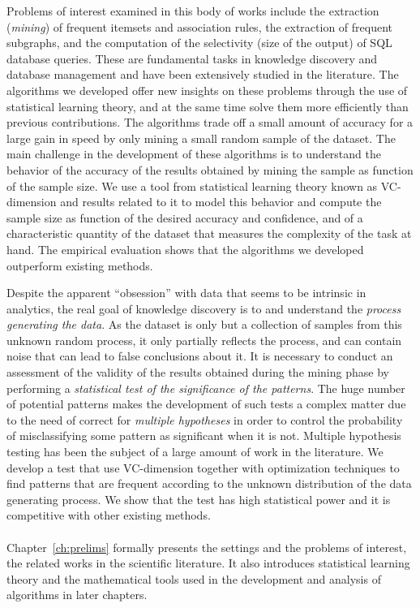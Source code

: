 Problems of interest examined in this body of works include the extraction
(\emph{mining}) of frequent itemsets and association rules, the extraction of
frequent subgraphs, and the computation of the selectivity (size of the output)
of SQL database queries. These are fundamental tasks in knowledge discovery and
database management and have been extensively studied in the literature. The
algorithms we developed offer new insights on these problems through the use of
statistical learning theory, and at the same time solve them more efficiently
than previous contributions. The algorithms trade off a small amount of accuracy
for a large gain in speed by only mining a small random sample of the dataset.
The main challenge in the development of these algorithms is to understand the
behavior of the accuracy of the results obtained by mining the sample as
function of the sample size. We use a tool from statistical learning theory
known as VC-dimension and results related to it to model this behavior and
compute the sample size as function of the desired accuracy and confidence, and
of a characteristic quantity of the dataset that measures the complexity of the
task at hand. The empirical evaluation shows that the algorithms we developed
outperform existing methods.

Despite the apparent ``obsession'' with data that seems to be intrinsic in
analytics, the real goal of knowledge discovery is to and understand the
\emph{process generating the data}. As the dataset is only but a collection of
samples from this unknown random process, it only partially reflects the
process, and can contain noise that can lead to false conclusions about it. It
is necessary to conduct an assessment of the validity of the results obtained
during the mining phase by performing a \emph{statistical test of the
significance of the patterns}. The huge number of potential patterns makes the
development of such tests a complex matter due to the need of correct for
\emph{multiple hypotheses} in order to control the probability of misclassifying
some pattern as significant when it is not. Multiple hypothesis testing has been
the subject of a large amount of work in the literature. We develop a test that
use VC-dimension together with optimization techniques
to find patterns that are frequent according to the unknown distribution of the
data generating process. We show that the test has high statistical power and
it is competitive with other existing methods.

\paragraph*{}
Chapter~\ref{ch:prelims} formally presents the settings and the problems of
interest, the related works in the scientific literature. It also introduces
statistical learning theory and the mathematical tools used in the development
and analysis of algorithms in later chapters.

